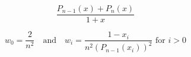 \documentclass{article}
\begin{document}
\[  \frac{P_{n-1}(x)+P_n(x)}{1+x}
\]
\pagebreak

\[  w_0=\frac{2}{n^2}\quad\text{and}
  \quad w_i=\frac{1-x_i}{n^2(P_{n-1}(x_i))^2}\text{ for }i>0
\]
\pagebreak
\end{document}
